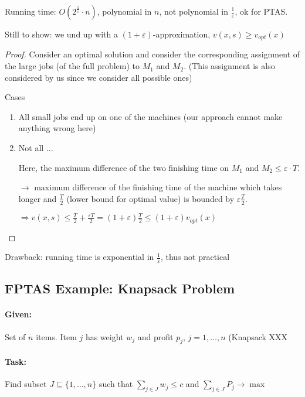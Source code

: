 \documentclass[11pt]{article}
\theoremstyle{definition}
\theoremstyle{definition}
\begin{document}
Running time: $O (2^{\frac{1}{\varepsilon}} \cdot n ) $, polynomial in $ n $, not polynomial in $ \frac{1}{\varepsilon} $, ok for PTAS. %

Still to show: we und up with a $ ( 1+ \varepsilon )$-approximation, $ v(x, s) \geq v_{opt} (x) $

\begin{proof}
Consider an optimal solution and consider the corresponding assignment of the large jobs (of the full problem) to $ M_1 $ and $ M_2 $. (This assignment is also considered by us since we consider all possible ones)

Cases
\begin{enumerate}
\item All small jobs end up on one of the machines (our approach cannot make anything wrong here)
\item Not all ...
	
	Here, the maximum difference of the two finishing time on $ M_1 $ and $ M_2 \leq \varepsilon \cdot T $.
	
	$ \rightarrow $ maximum difference of the finishing time of the machine which takes longer and $ \frac{T}{2} $ (lower bound for optimal value) is bounded by $ \varepsilon \frac{T}{2} $.
	
	$ \Rightarrow v(x, s) \leq \frac{T}{2} + \frac{\varepsilon T}{2} = (1 + \varepsilon) \frac{T}{2} \leq (1 + \varepsilon) v_{opt} (x) $
\end{enumerate}

\end{proof}

Drawback: running time is exponential in $ \frac{1}{\varepsilon} $, thus not practical

\subsection{FPTAS Example: Knapsack Problem}

\paragraph{Given:} Set of $ n $ items. Item $ j $ has weight $ w_j $ and profit $ p_j $, $ j = 1, \dots, n $ (Knapsack XXX

\paragraph{Task:} Find subset $ J \subseteq \{1, \dots, n\} $ such that $ \sum \limits_{j \in J} w_j \leq c $ and $ \sum \limits_{j \in J} P_j \rightarrow \max $
\end{document}
